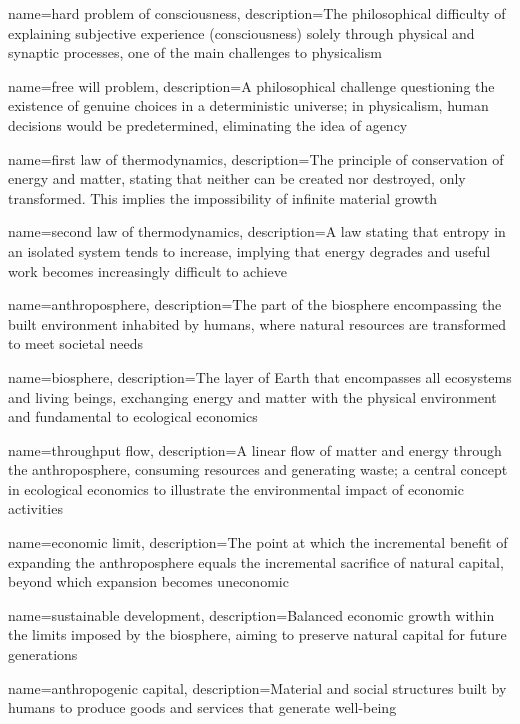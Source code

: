 {
	name=hard problem of consciousness,
	description={The philosophical difficulty of explaining subjective experience (consciousness) solely through physical and synaptic processes, one of the main challenges to physicalism}
}

{
	name=free will problem,
	description={A philosophical challenge questioning the existence of genuine choices in a deterministic universe; in physicalism, human decisions would be predetermined, eliminating the idea of agency}
}

{
	name=first law of thermodynamics,
	description={The principle of conservation of energy and matter, stating that neither can be created nor destroyed, only transformed. This implies the impossibility of infinite material growth}
}

{
	name=second law of thermodynamics,
	description={A law stating that entropy in an isolated system tends to increase, implying that energy degrades and useful work becomes increasingly difficult to achieve}
}

{
	name=anthroposphere,
	description={The part of the biosphere encompassing the built environment inhabited by humans, where natural resources are transformed to meet societal needs}
}

{
	name=biosphere,
	description={The layer of Earth that encompasses all ecosystems and living beings, exchanging energy and matter with the physical environment and fundamental to ecological economics}
}

{
	name=throughput flow,
	description={A linear flow of matter and energy through the anthroposphere, consuming resources and generating waste; a central concept in ecological economics to illustrate the environmental impact of economic activities}
}

{
	name=economic limit,
	description={The point at which the incremental benefit of expanding the anthroposphere equals the incremental sacrifice of natural capital, beyond which expansion becomes uneconomic}
}

{
	name=sustainable development,
	description={Balanced economic growth within the limits imposed by the biosphere, aiming to preserve natural capital for future generations}
}

{
	name=anthropogenic capital,
	description={Material and social structures built by humans to produce goods and services that generate well-being}
}

